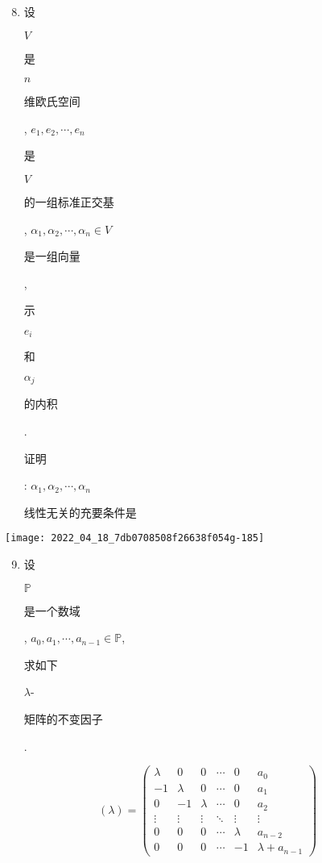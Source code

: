 \documentclass[10pt]{article}
\begin{document}
\begin{enumerate}
  \setcounter{enumi}{7}
  \item \begin{CJK}{UTF8}{mj}设\end{CJK} $V$ \begin{CJK}{UTF8}{mj}是\end{CJK} $n$ \begin{CJK}{UTF8}{mj}维欧氏空间\end{CJK}, $e_{1}, e_{2}, \cdots, e_{n}$ \begin{CJK}{UTF8}{mj}是\end{CJK} $V$ \begin{CJK}{UTF8}{mj}的一组标准正交基\end{CJK}, $\alpha_{1}, \alpha_{2}, \cdots, \alpha_{n} \in V$ \begin{CJK}{UTF8}{mj}是一组向量\end{CJK}, \begin{CJK}{UTF8}{mj}示\end{CJK} $e_{i}$ \begin{CJK}{UTF8}{mj}和\end{CJK} $\alpha_{j}$ \begin{CJK}{UTF8}{mj}的内积\end{CJK}. \begin{CJK}{UTF8}{mj}证明\end{CJK}: $\alpha_{1}, \alpha_{2}, \cdots, \alpha_{n}$ \begin{CJK}{UTF8}{mj}线性无关的充要条件是\end{CJK}
\end{enumerate}
\texttt{[image: 2022\_04\_18\_7db0708508f26638f054g-185]}

\begin{enumerate}
  \setcounter{enumi}{8}
  \item \begin{CJK}{UTF8}{mj}设\end{CJK} $\mathbb{P}$ \begin{CJK}{UTF8}{mj}是一个数域\end{CJK}, $a_{0}, a_{1}, \cdots, a_{n-1} \in \mathbb{P}$, \begin{CJK}{UTF8}{mj}求如下\end{CJK} $\lambda$-\begin{CJK}{UTF8}{mj}矩阵的不变因子\end{CJK}.
\end{enumerate}
$$
(\lambda)=\left(\begin{array}{cccccc}
\lambda & 0 & 0 & \cdots & 0 & a_{0} \\
-1 & \lambda & 0 & \cdots & 0 & a_{1} \\
0 & -1 & \lambda & \cdots & 0 & a_{2} \\
\vdots & \vdots & \vdots & \ddots & \vdots & \vdots \\
0 & 0 & 0 & \cdots & \lambda & a_{n-2} \\
0 & 0 & 0 & \cdots & -1 & \lambda+a_{n-1}
\end{array}\right)
$$
\end{document}
